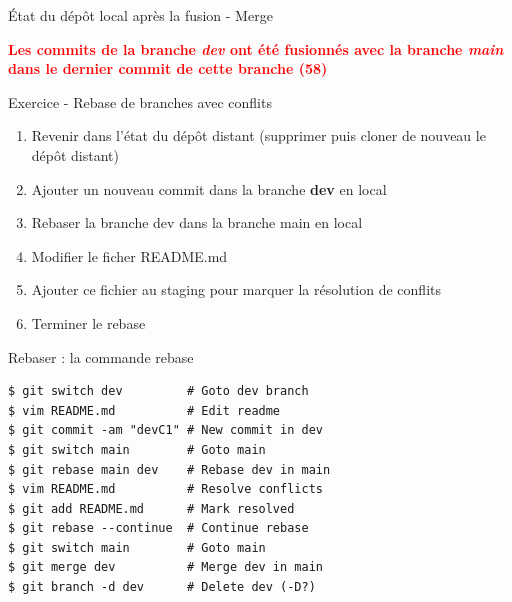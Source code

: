 \documentclass[a4paper,11pt]{beamer}
\newcounter{exampleBlockCounter}
\begin{document}
\begin{frame}

\begin{block}{État du dépôt local après la fusion - Merge}
\centering

\end{block}
\centering
\textbf{\textcolor{red}{Les commits de la branche \textit{dev} ont été fusionnés avec la branche \textit{main} dans le dernier commit de cette branche (58)}}

\end{frame}

\begin{frame}[containsverbatim]

\begin{exampleblock}{Exercice  - Rebase de branches avec conflits}
\begin{enumerate}
	\item Revenir dans l'état du dépôt distant (supprimer puis cloner de nouveau le dépôt distant)
	\item Ajouter un nouveau commit dans la branche \textbf{dev} en local
    \item Rebaser la branche dev dans la branche main en local
    \item Modifier le ficher README.md
    \item Ajouter ce fichier au staging pour marquer la résolution de conflits
    \item Terminer le rebase
\end{enumerate}

\end{exampleblock}

\end{frame}

\begin{frame}[containsverbatim]

\begin{alertblock}{Rebaser : la commande rebase}
\begin{lstlisting}
$ git switch dev         # Goto dev branch
$ vim README.md          # Edit readme
$ git commit -am "devC1" # New commit in dev
$ git switch main        # Goto main
$ git rebase main dev    # Rebase dev in main
$ vim README.md          # Resolve conflicts
$ git add README.md      # Mark resolved
$ git rebase --continue  # Continue rebase
$ git switch main        # Goto main
$ git merge dev          # Merge dev in main
$ git branch -d dev      # Delete dev (-D?)
\end{lstlisting}
\end{alertblock}

\end{frame}
\end{document}
